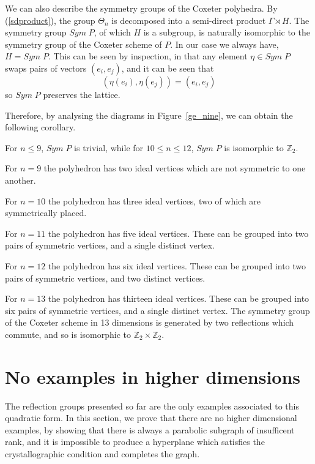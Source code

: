 \documentclass[smallcondensed]{svjour3}                     %
\begin{document}
We can also describe the symmetry groups of the Coxeter polyhedra. By (\ref{sdproduct}), the group $\Theta_n$ is decomposed into a semi-direct product $\Gamma \rtimes H$. The symmetry group $Sym \; P$, of which $H$ is a subgroup, is naturally isomorphic to the symmetry group of the Coxeter scheme of $P$. In our case we always have, $H = Sym \; P$. This can be seen by inspection, in that any element $\eta \in Sym \; P$ swaps pairs of vectors $(e_i, e_j)$, and it can be seen that 
\[(\eta(e_i), \eta(e_j)) = (e_i, e_j)\]
so $Sym \; P$ preserves the lattice.

Therefore, by analysing the diagrams in Figure~\ref{ge_nine}, we can obtain the following corollary.

\begin{corollary}
For $n \le 9$, $Sym \; P$ is trivial, while for $10 \le n \le 12$, $Sym \; P$ is isomorphic to $\mathbb{Z}_2$.

For $n=9$ the polyhedron has two ideal vertices which are not symmetric to one another.

For $n=10$ the polyhedron has three ideal vertices, two of which are symmetrically placed.

For $n=11$ the polyhedron has five ideal vertices. These can be grouped into two pairs of symmetric vertices, and a single distinct vertex.

For $n=12$ the polyhedron has six ideal vertices. These can be grouped into two pairs of symmetric vertices, and two distinct vertices.

For $n=13$ the polyhedron has thirteen ideal vertices. These can be grouped into six pairs of symmetric vertices, and a single distinct vertex. The symmetry group of the Coxeter scheme in 13 dimensions is generated by two reflections which commute, and so is isomorphic to $\mathbb{Z}_2 \times \mathbb{Z}_2$.
\end{corollary}

\section{No examples in higher dimensions}\label{noexamplesinhigherdimensions}
The reflection groups presented so far are the only examples associated to this quadratic form. In this section, we prove that there are no higher dimensional examples, by showing that there is always a parabolic subgraph of insufficent rank, and it is impossible to produce a hyperplane which satisfies the crystallographic condition and completes the graph.
\end{document}
